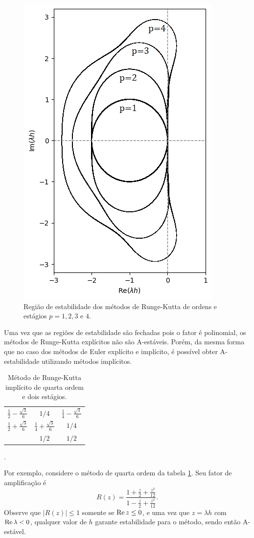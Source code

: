 \begin{figure}
    \centering
    \includegraphics[width=0.35\linewidth]{tcc//img/regiao_estabilidade_rk.png}
    \caption{Região de estabilidade dos métodos de Runge-Kutta de ordens e estágios $p = 1, 2, 3$ e $4$.}
    \label{fig:regiao_estabilidade_rk_explicitos}
\end{figure}

Uma vez que as regiões de estabilidade são fechadas pois o fator é polinomial, os métodos de Runge-Kutta explícitos não são A-estáveis. Porém, da mesma forma que no caso dos métodos de Euler explícito e implícito, é possível obter A-estabilidade utilizando métodos implícitos. 
\begin{table}[H]
    \centering

    \begin{tabular}{c|cc}
        $\frac{1}{2} - \frac{\sqrt 3}{6}$ & $1/4$ & $\frac{1}{4} - \frac{\sqrt 3}{6}$ \\
        $\frac{1}{2} + \frac{\sqrt 3}{6}$ & $\frac{1}{4} + \frac{\sqrt 3}{6}$ & $1/4$ \\
        \hline & $1/2$ & $1/2$
    \end{tabular}
    
    \caption{Método de Runge-Kutta implícito de quarta ordem e dois estágios. \citep[99]{Butcher2016-jx}}.
    \label{tab:exemplo_metodo_runge_kutta_implicito}
\end{table}

Por exemplo, considere o método de quarta ordem da tabela \ref{tab:exemplo_metodo_runge_kutta_implicito}. Seu fator de amplificação é
\begin{equation*}
    R(z) = \dfrac{1 + \frac{z}{2} + \frac{z^2}{12}}{1 - \frac{z}{2} + \frac{z^2}{12}}.
\end{equation*}
Observe que $|R(z)| \leq 1$ somente se $\operatorname{\operatorname{Re}}{z} \leq 0$, e uma vez que $z = \lambda h$ com $\operatorname{\operatorname{Re}}{\lambda} < 0$, qualquer valor de $h$ garante estabilidade para o método, sendo então A-estável.

